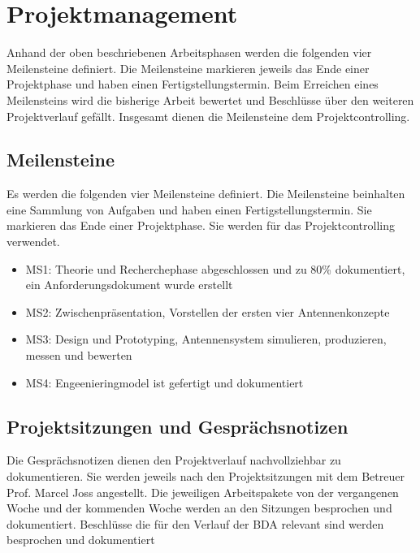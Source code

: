 \newpage
\section{Projektmanagement}
Anhand der oben beschriebenen Arbeitsphasen werden die folgenden vier Meilensteine definiert. Die Meilensteine markieren jeweils das Ende einer Projektphase und haben einen Fertigstellungstermin. Beim Erreichen eines Meilensteins wird die bisherige Arbeit bewertet und Beschlüsse über den weiteren Projektverlauf gefällt. Insgesamt dienen die Meilensteine dem Projektcontrolling.
\subsection{Meilensteine}
Es werden die folgenden vier Meilensteine definiert. Die Meilensteine
beinhalten   eine Sammlung von Aufgaben und haben einen
Fertigstellungstermin. Sie markieren das Ende einer Projektphase. Sie
werden für das Projektcontrolling verwendet. 
	\begin{itemize}
		\item MS1: Theorie und Recherchephase abgeschlossen und zu 80\% dokumentiert, ein Anforderungsdokument wurde erstellt
		\item MS2: Zwischenpräsentation, Vorstellen der ersten vier Antennenkonzepte
		\item MS3: Design und Prototyping, Antennensystem simulieren, produzieren, messen und bewerten
		\item MS4: Engeenieringmodel ist gefertigt und dokumentiert
	\end{itemize}

\subsection{ Projektsitzungen und Gesprächsnotizen}
Die Gesprächsnotizen dienen den Projektverlauf nachvollziehbar zu dokumentieren. Sie werden jeweils nach den Projektsitzungen mit dem Betreuer Prof. Marcel Joss angestellt. Die jeweiligen Arbeitspakete von der vergangenen Woche und der kommenden Woche werden an den Sitzungen besprochen und dokumentiert. Beschlüsse die für den Verlauf der BDA relevant sind werden besprochen und dokumentiert
